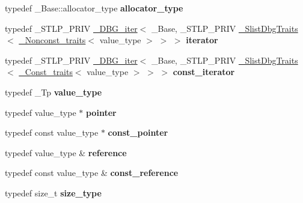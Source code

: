 \begin{DoxyCompactItemize}
\item 
\mbox{\label{classslist_a4fdfa3ed46b9187e1024f7dc247ddca8}} 
typedef \+\_\+\+Base\+::allocator\+\_\+type {\bfseries allocator\+\_\+type}
\item 
\mbox{\label{classslist_a230531763e4c072144bc55461e978729}} 
typedef \+\_\+\+S\+T\+L\+P\+\_\+\+P\+R\+IV \hyperlink{struct___d_b_g__iter}{\+\_\+\+D\+B\+G\+\_\+iter}$<$ \+\_\+\+Base, \+\_\+\+S\+T\+L\+P\+\_\+\+P\+R\+IV \hyperlink{struct___slist_dbg_traits}{\+\_\+\+Slist\+Dbg\+Traits}$<$ \hyperlink{struct___nonconst__traits}{\+\_\+\+Nonconst\+\_\+traits}$<$ value\+\_\+type $>$ $>$ $>$ {\bfseries iterator}
\item 
\mbox{\label{classslist_a1887cba1bdb9f95611e13da89c449ec7}} 
typedef \+\_\+\+S\+T\+L\+P\+\_\+\+P\+R\+IV \hyperlink{struct___d_b_g__iter}{\+\_\+\+D\+B\+G\+\_\+iter}$<$ \+\_\+\+Base, \+\_\+\+S\+T\+L\+P\+\_\+\+P\+R\+IV \hyperlink{struct___slist_dbg_traits}{\+\_\+\+Slist\+Dbg\+Traits}$<$ \hyperlink{struct___const__traits}{\+\_\+\+Const\+\_\+traits}$<$ value\+\_\+type $>$ $>$ $>$ {\bfseries const\+\_\+iterator}
\item 
\mbox{\label{classslist_afa1bad898a7ba1cc8fd08c8e5e5f9a1c}} 
typedef \+\_\+\+Tp {\bfseries value\+\_\+type}
\item 
\mbox{\label{classslist_a58acf9c024ec300b5e2db9f3ca7d9daa}} 
typedef value\+\_\+type $\ast$ {\bfseries pointer}
\item 
\mbox{\label{classslist_a07610436dfec19284e3540b4e717d83a}} 
typedef const value\+\_\+type $\ast$ {\bfseries const\+\_\+pointer}
\item 
\mbox{\label{classslist_aebb1688a50407c646984dcbfa64b4579}} 
typedef value\+\_\+type \& {\bfseries reference}
\item 
\mbox{\label{classslist_a505252adea09cef998d66525a493359f}} 
typedef const value\+\_\+type \& {\bfseries const\+\_\+reference}
\item 
\mbox{\label{classslist_a30df20d89ac6a2a70a32aadf6aab3bd3}} 
typedef size\+\_\+t {\bfseries size\+\_\+type}
\item 

\end{DoxyCompactItemize}
